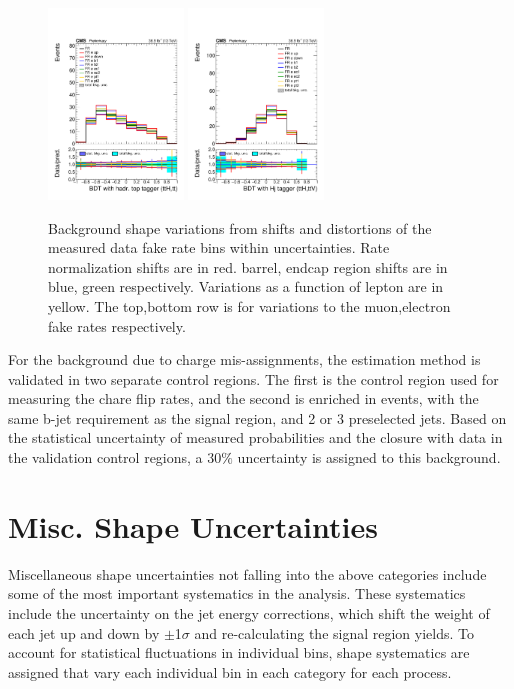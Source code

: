\begin{figure}[htb]
        \includegraphics[width=0.32\textwidth]{ch10_figs/kinMVA_2lss_e_ttbar_withBDTv8.pdf}
        \includegraphics[width=0.32\textwidth]{ch10_figs/kinMVA_2lss_e_ttV_withHj.pdf}
        \caption{Background shape variations from shifts and distortions of the measured data fake rate bins within uncertainties. 
          Rate normalization shifts are in red. barrel, endcap region shifts are in blue, green respectively. Variations as a function
          of lepton \pt are in yellow. The top,bottom row is for variations to the muon,electron fake rates respectively.}
        \label{fig:FRvars_shape}
\end{figure}

For the background due to charge mis-assignments, the estimation method is validated in two separate control regions.
The first is the control region used for measuring the chare flip rates, and the second is enriched in \ttbar events, with the same b-jet
requirement as the signal region, and 2 or 3 preselected jets. Based on the statistical uncertainty of measured probabilities
and the closure with data in the validation control regions, a 30$\%$ uncertainty is assigned to this background. 



\section{Misc. Shape Uncertainties}
Miscellaneous shape uncertainties not falling into the above categories include some of the most important systematics in the analysis.
These systematics include the uncertainty on the jet energy corrections, which  shift the weight of each jet up and down
by $\pm$1$\sigma$ and re-calculating the signal region yields. To account for statistical fluctuations in individual bins, shape systematics
are assigned that vary each individual bin in each category for each process. 




